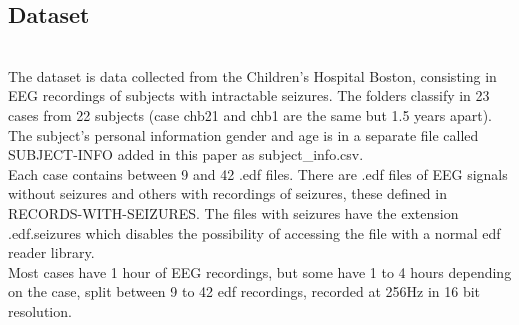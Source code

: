 ﻿\documentclass[10pt,a4paper,twocolumn,twoside]{article}
\begin{document}
\subsection{Dataset}
\leavevmode\\
The dataset is data collected from the Children’s Hospital Boston, consisting in EEG recordings of subjects with intractable seizures. The folders classify in 23 cases from 22 subjects (case chb21 and chb1 are the same but 1.5 years apart). The subject’s personal information gender and age is in a separate file called SUBJECT-INFO added in this paper as subject\_info.csv.
\\
Each case contains between 9 and 42 .edf files. There are .edf files of EEG signals without seizures and others with recordings of seizures, these defined in RECORDS-WITH-SEIZURES. The files with seizures have the extension .edf.seizures which disables the possibility of accessing the file with a normal edf reader library.
\\
Most cases have 1 hour of EEG recordings, but some have 1 to 4 hours depending on the case, split between 9 to 42 edf recordings, recorded at 256Hz in 16 bit resolution.
\\


\end{document}
